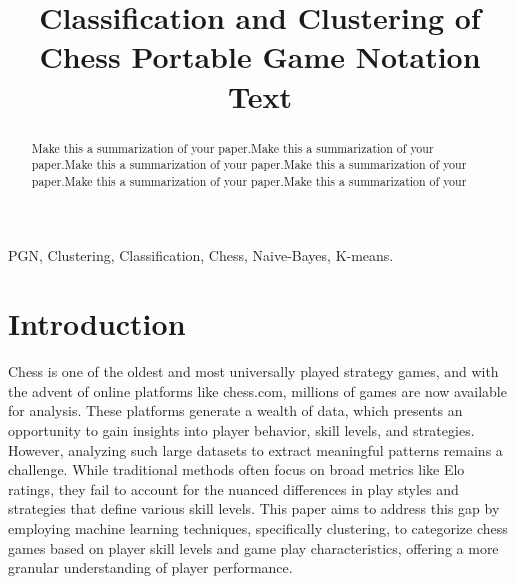 \documentclass[conference]{IEEEtran}
\begin{document}
\title{Classification and Clustering of Chess Portable Game Notation Text\\
}

\author{
\and
{}
}

\maketitle

\begin{abstract}
Make this a summarization of your paper.Make this a summarization of your paper.Make this a summarization of your paper.Make this a summarization of your paper.Make this a summarization of your paper.Make this a summarization of your 
\end{abstract}

\begin{IEEEkeywords}
PGN, Clustering, Classification, Chess, Naive-Bayes, K-means.
\end{IEEEkeywords}

\section{Introduction}
Chess is one of the oldest and most universally played strategy games, and with the advent of online platforms like chess.com, millions of games are now available for analysis. These platforms generate a wealth of data, which presents an opportunity to gain insights into player behavior, skill levels, and strategies. However, analyzing such large datasets to extract meaningful patterns remains a challenge. While traditional methods often focus on broad metrics like Elo ratings, they fail to account for the nuanced differences in play styles and strategies that define various skill levels. This paper aims to address this gap by employing machine learning techniques, specifically clustering, to categorize chess games based on player skill levels and game play characteristics, offering a more granular understanding of player performance.
\end{document}
